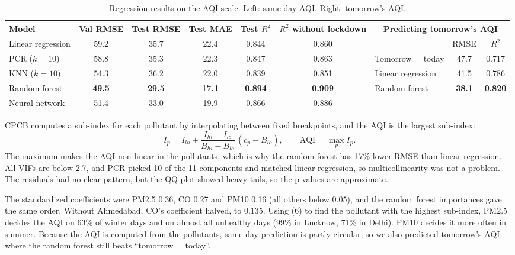 \documentclass[10pt,a4paper]{article}
\begin{document}
\begin{table}[!htb]\centering\footnotesize\setlength{\tabcolsep}{4.5pt}
\begin{tabular}{lccccc|lcc}\toprule
Model & Val RMSE & Test RMSE & Test MAE & Test $R^2$ & $R^2$ without lockdown & \multicolumn{3}{c}{Predicting tomorrow's AQI}\\\midrule
Linear regression & 59.2 & 35.7 & 22.4 & 0.844 & 0.860 & & RMSE & $R^2$\\
PCR ($k=10$) & 58.8 & 35.3 & 22.3 & 0.847 & 0.863 & Tomorrow = today & 47.7 & 0.717\\
KNN ($k=10$) & 54.3 & 36.2 & 22.0 & 0.839 & 0.851 & Linear regression & 41.5 & 0.786\\
Random forest & \textbf{49.5} & \textbf{29.5} & \textbf{17.1} & \textbf{0.894} & \textbf{0.909} & Random forest & \textbf{38.1} & \textbf{0.820}\\
Neural network & 51.4 & 33.0 & 19.9 & 0.866 & 0.886 & & &\\\bottomrule
\end{tabular}
\caption{Regression results on the AQI scale. Left: same-day AQI. Right: tomorrow's AQI.}
\end{table}

CPCB computes a sub-index for each pollutant by interpolating between fixed breakpoints, and the AQI is the largest sub-index:
\begin{equation}
I_p=I_{lo}+\frac{I_{hi}-I_{lo}}{B_{hi}-B_{lo}}\,(c_p-B_{lo}),\qquad \text{AQI}=\max_p I_p .
\end{equation}
The maximum makes the AQI non-linear in the pollutants, which is why the random forest has 17\% lower RMSE than linear regression. All VIFs are below 2.7, and PCR picked 10 of the 11 components and matched linear regression, so multicollinearity was not a problem. The residuals had no clear pattern, but the QQ plot showed heavy tails, so the p-values are approximate.

The standardized coefficients were PM2.5 0.36, CO 0.27 and PM10 0.16 (all others below 0.05), and the random forest importances gave the same order. Without Ahmedabad, CO's coefficient halved, to 0.135. Using (6) to find the pollutant with the highest sub-index, PM2.5 decides the AQI on 63\% of winter days and on almost all unhealthy days (99\% in Lucknow, 71\% in Delhi). PM10 decides it more often in summer. Because the AQI is computed from the pollutants, same-day prediction is partly circular, so we also predicted tomorrow's AQI, where the random forest still beats ``tomorrow = today''.
\end{document}
